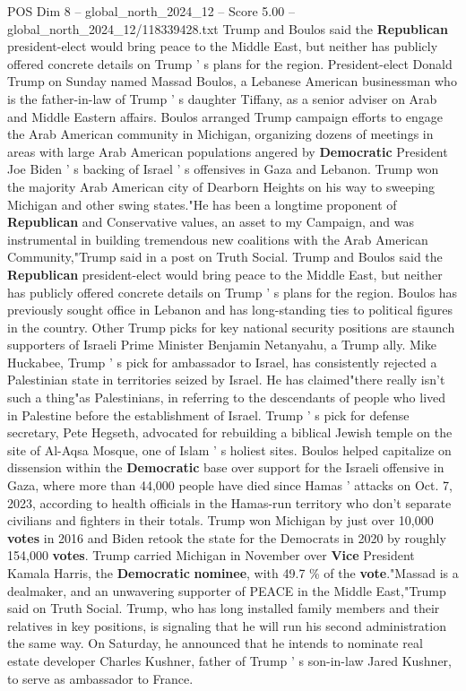 \begin{textsample}{POS Dim 8 – global\_north\_2024\_12 – Score 5.00 – global\_north\_2024\_12/118339428.txt}  \label{ex:f8_pos_348}
Trump and Boulos said the \textbf{Republican} president-elect would bring peace to the Middle East, but neither has publicly offered concrete details on Trump ' s plans for the region.
President-elect Donald Trump on Sunday named Massad Boulos, a Lebanese American businessman who is the father-in-law of Trump ' s daughter Tiffany, as a senior adviser on Arab and Middle Eastern affairs.
Boulos arranged Trump campaign efforts to engage the Arab American community in Michigan, organizing dozens of meetings in areas with large Arab American populations angered by \textbf{Democratic} President Joe Biden ' s backing of Israel ' s offensives in Gaza and Lebanon.
Trump won the majority Arab American city of Dearborn Heights on his way to sweeping Michigan and other swing states."He has been a longtime proponent of \textbf{Republican} and Conservative values, an asset to my Campaign, and was instrumental in building tremendous new coalitions with the Arab American Community,"Trump said in a post on Truth Social.
Trump and Boulos said the \textbf{Republican} president-elect would bring peace to the Middle East, but neither has publicly offered concrete details on Trump ' s plans for the region.
Boulos has previously sought office in Lebanon and has long-standing ties to political figures in the country.
Other Trump picks for key national security positions are staunch supporters of Israeli Prime Minister Benjamin Netanyahu, a Trump ally.
Mike Huckabee, Trump ' s pick for ambassador to Israel, has consistently rejected a Palestinian state in territories seized by Israel.
He has claimed"there really isn't such a thing"as Palestinians, in referring to the descendants of people who lived in Palestine before the establishment of Israel.
Trump ' s pick for defense secretary, Pete Hegseth, advocated for rebuilding a biblical Jewish temple on the site of Al-Aqsa Mosque, one of Islam ' s holiest sites.
Boulos helped capitalize on dissension within the \textbf{Democratic} base over support for the Israeli offensive in Gaza, where more than 44,000 people have died since Hamas ' attacks on Oct. 7, 2023, according to health officials in the Hamas-run territory who don't separate civilians and fighters in their totals.
Trump won Michigan by just over 10,000 \textbf{votes} in 2016 and Biden retook the state for the Democrats in 2020 by roughly 154,000 \textbf{votes}.
Trump carried Michigan in November over \textbf{Vice} President Kamala Harris, the \textbf{Democratic} \textbf{nominee}, with 49.7 \% of the \textbf{vote}."Massad is a dealmaker, and an unwavering supporter of PEACE in the Middle East,"Trump said on Truth Social.
Trump, who has long installed family members and their relatives in key positions, is signaling that he will run his second administration the same way.
On Saturday, he announced that he intends to nominate real estate developer Charles Kushner, father of Trump ' s son-in-law Jared Kushner, to serve as ambassador to France.

\end{textsample}
